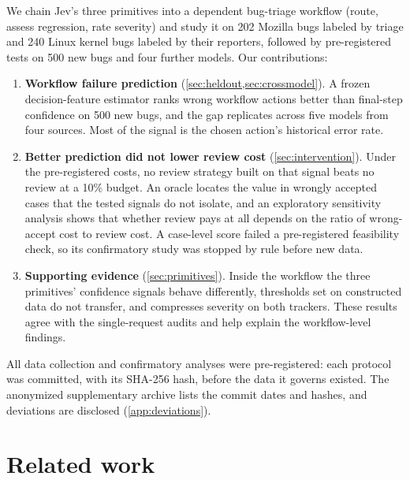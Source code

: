 We chain Jev's three primitives into a dependent bug-triage workflow
(route, assess regression, rate severity) and study it on 202 Mozilla
bugs labeled by triage and 240 Linux kernel bugs labeled by their
reporters, followed by pre-registered tests on 500 new bugs and four
further models. Our contributions:
\begin{enumerate}
  \item \textbf{Workflow failure prediction} (\cref{sec:heldout,sec:crossmodel}).
  A frozen decision-feature estimator ranks wrong workflow actions better
  than final-step confidence on 500 new bugs, and the gap replicates
  across five models from four sources. Most of the signal is the chosen
  action's historical error rate.
  \item \textbf{Better prediction did not lower review cost} (\cref{sec:intervention}).
  Under the pre-registered costs, no review strategy built on that signal
  beats no review at a 10\% budget. An oracle locates the value in wrongly
  accepted cases that the tested signals do not isolate, and an
  exploratory sensitivity analysis shows that whether review pays at all
  depends on the ratio of wrong-accept cost to review cost. A case-level
  score failed a pre-registered feasibility check, so its confirmatory
  study was stopped by rule before new data.
  \item \textbf{Supporting evidence} (\cref{sec:primitives}). Inside the
  workflow the three primitives' confidence signals behave differently,
  thresholds set on constructed data do not transfer, and \score{}
  compresses severity on both trackers. These results agree with the
  single-request audits and help explain the workflow-level findings.
\end{enumerate}
All data collection and confirmatory analyses were pre-registered: each
protocol was committed, with its SHA-256 hash, before the data it governs
existed. The anonymized supplementary archive lists the commit dates and
hashes, and deviations are disclosed (\cref{app:deviations}).

\section{Related work}

